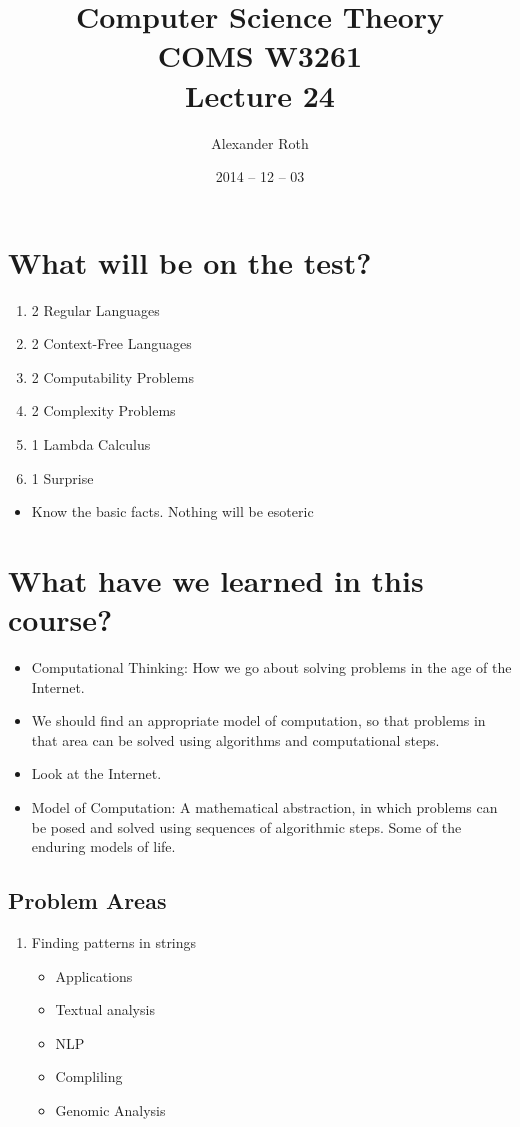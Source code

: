 \documentclass[]{article}
\begin{document}
\newtheorem{thm}{Theorem}
\title{Computer Science Theory \\ COMS W3261 \\ Lecture 24}
\author{Alexander Roth}
\date{2014 -- 12 -- 03}
\maketitle

\section*{What will be on the test?}
\begin{enumerate}
\item 2 Regular Languages
\item 2 Context-Free Languages
\item 2 Computability Problems
\item 2 Complexity Problems
\item 1 Lambda Calculus
\item 1 Surprise
\end{enumerate}

\begin{itemize}
\item Know the basic facts. Nothing will be esoteric
\end{itemize}

\section*{What have we learned in this course?}
\begin{itemize}
\item Computational Thinking: How we go about solving problems in the age of the
Internet.
\item We should find an appropriate model of computation, so that problems in
that area can be solved using algorithms and computational steps.
\item Look at the Internet.
\item Model of Computation: A mathematical abstraction, in which problems can be
posed and solved using sequences of algorithmic steps. Some of the enduring
models of life.
\end{itemize}

\subsection*{Problem Areas}
\begin{enumerate}
\item Finding patterns in strings
\begin{itemize}
\item Applications
\item Textual analysis
\item NLP
\item Compliling
\item Genomic Analysis
\end{itemize}
\end{enumerate}
\end{document}
